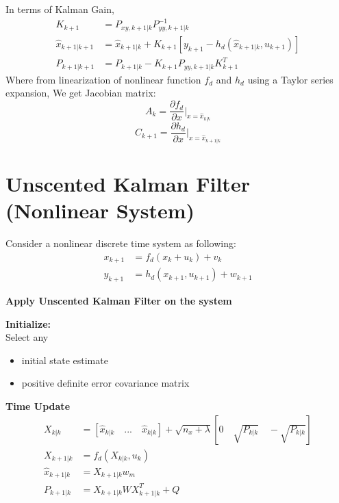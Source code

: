 \documentclass[12pt,a4paper]{article}
\begin{document}
	In terms of Kalman Gain,
	\begin{equation}
		\begin{split}
			K_{k+1} &= P_{xy,k+1|k}P^{-1}_{yy,k+1|k}\\
			\hat{x}_{k+1|k+1} &= \hat{x}_{k+1|k} + K_{k+1}[y_{k+1} - h_d(\hat{x}_{k+1|k},u_{k+1})] \\
			P_{k+1|k+1} &= P_{k+1|k} - K_{k+1} P_{yy,k+1|k}K^T_{k+1}
		\end{split}
		\label{eq8}
	\end{equation}
	Where from linearization of nonlinear function $f_d$ and $h_d$ using a Taylor series expansion, We get Jacobian matrix:
	\[A_k = \frac{\partial f_d}{\partial x}|_{x=\hat{x}_{k|k}}\]
	\[C_{k+1} = \frac{\partial h_d}{\partial x}|_{x=\hat{x}_{k+1|k}}\]
	\section{Unscented Kalman Filter (Nonlinear System)}
	Consider a nonlinear discrete time system as following:
	\begin{equation}
		\begin{split}
			x_{k+1} &= f_d(x_k+u_k) + v_k \\
			y_{k+1} &= h_d(x_{k+1},u_{k+1}) + w_{k+1}
		\end{split}
		\label{eq9}
	\end{equation}
	\begin{center}
		\textbf{Apply Unscented Kalman Filter on the system}
	\end{center}
	\textbf{Initialize:}\\
	Select any
	\begin{itemize}
		\item { initial state estimate}
		\item { positive definite error covariance matrix}
	\end{itemize}
	\textbf{Time Update}
	\begin{equation}
		\begin{split}
			X_{k|k} &= [\hat{x}_{k|k}\quad ...\quad \hat{x}_{k|k}]+\sqrt{n_x + \lambda}[0\quad \sqrt{P_{k|k}}\quad -\sqrt{P_{k|k}}]\\
			X_{k+1|k} &= f_d(X_{k|k},u_k)\\
			\hat{x}_{k+1|k} &= X_{k+1|k}w_m\\
			P_{k+1|k} &= X_{k+1|k}WX^T_{k+1|k} + Q
		\end{split}
		\label{eq10}
	\end{equation}
\end{document}
